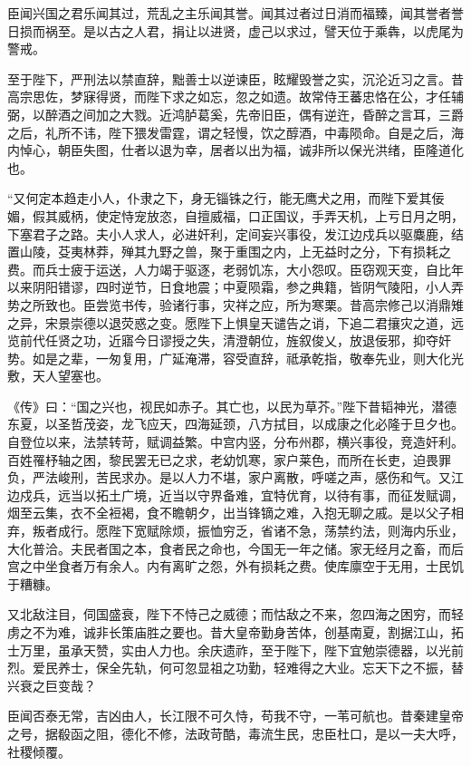 \documentclass[12pt,UTF8]{ctexbook}
\begin{document}
臣闻兴国之君乐闻其过，荒乱之主乐闻其誉。闻其过者过日消而福臻，闻其誉者誉日损而祸至。是以古之人君，捐让以进贤，虚己以求过，譬天位于乘犇，以虎尾为警戒。

至于陛下，严刑法以禁直辞，黜善士以逆谏臣，眩耀毁誉之实，沉沦近习之言。昔高宗思佐，梦寐得贤，而陛下求之如忘，忽之如遗。故常侍王蕃忠恪在公，才任辅弼，以醉酒之间加之大戮。近鸿胪葛奚，先帝旧臣，偶有逆迕，昏醉之言耳，三爵之后，礼所不讳，陛下猥发雷霆，谓之轻慢，饮之醇酒，中毒陨命。自是之后，海内悼心，朝臣失图，仕者以退为幸，居者以出为福，诚非所以保光洪绪，臣隆道化也。

“又何定本趋走小人，仆隶之下，身无锱铢之行，能无鹰犬之用，而陛下爱其佞媚，假其威柄，使定恃宠放恣，自擅威福，口正国议，手弄天机，上亏日月之明，下塞君子之路。夫小人求人，必进奸利，定间妄兴事役，发江边戍兵以驱麋鹿，结置山陵，芟夷林莽，殚其九野之兽，聚于重围之内，上无益时之分，下有损耗之费。而兵士疲于运送，人力竭于驱逐，老弱饥冻，大小怨叹。臣窃观天变，自比年以来阴阳错谬，四时逆节，日食地震；中夏陨霜，参之典籍，皆阴气陵阳，小人弄势之所致也。臣尝览书传，验诸行事，灾祥之应，所为寒栗。昔高宗修己以消鼎雉之异，宋景崇德以退荧惑之变。愿陛下上惧皇天谴告之诮，下追二君攘灾之道，远览前代任贤之功，近寤今日谬授之失，清澄朝位，旌叙俊乂，放退佞邪，抑夺奸势。如是之辈，一匆复用，广延淹滞，容受直辞，祗承乾指，敬奉先业，则大化光敷，天人望塞也。

《传》曰：“国之兴也，视民如赤子。其亡也，以民为草芥。”陛下昔韬神光，潜德东夏，以圣哲茂姿，龙飞应天，四海延颈，八方拭目，以成康之化必隆于旦夕也。自登位以来，法禁转苛，赋调益繁。中宫内竖，分布州郡，横兴事役，竞造奸利。百姓罹杼轴之困，黎民罢无已之求，老幼饥寒，家户莱色，而所在长吏，迫畏罪负，严法峻刑，苦民求办。是以人力不堪，家户离散，呼嗟之声，感伤和气。又江边戍兵，远当以拓土广境，近当以守界备难，宜特优育，以待有事，而征发赋调，烟至云集，衣不全裋褐，食不瞻朝夕，出当锋镝之难，入抱无聊之戚。是以父子相弃，叛者成行。愿陛下宽赋除烦，振恤穷乏，省诸不急，荡禁约法，则海内乐业，大化普洽。夫民者国之本，食者民之命也，今国无一年之储。家无经月之畜，而后宫之中坐食者万有余人。内有离旷之怨，外有损耗之费。使库廪空于无用，士民饥于糟糠。

又北敌注目，伺国盛衰，陛下不恃己之威德；而怙敌之不来，忽四海之困穷，而轻虏之不为难，诚非长策庙胜之要也。昔大皇帝勤身苦体，创基南夏，割据江山，拓士万里，虽承天赞，实由人力也。余庆遗祚，至于陛下，陛下宜勉崇德器，以光前烈。爱民养士，保全先轨，何可忽显祖之功勤，轻难得之大业。忘天下之不振，替兴衰之巨变哉？

臣闻否泰无常，吉凶由人，长江限不可久恃，苟我不守，一苇可航也。昔秦建皇帝之号，据殽函之阻，德化不修，法政苛酷，毒流生民，忠臣杜口，是以一夫大呼，社稷倾覆。
\end{document}
